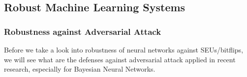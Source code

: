 
\subsection{Robust Machine Learning Systems}
\noindent

\subsubsection{Robustness against Adversarial Attack}

Before we take a look into robustness of neural networks against SEUs/bitflips, we will see what are the defenses against adversarial attack applied in recent research, especially for Bayesian Neural Networks.





